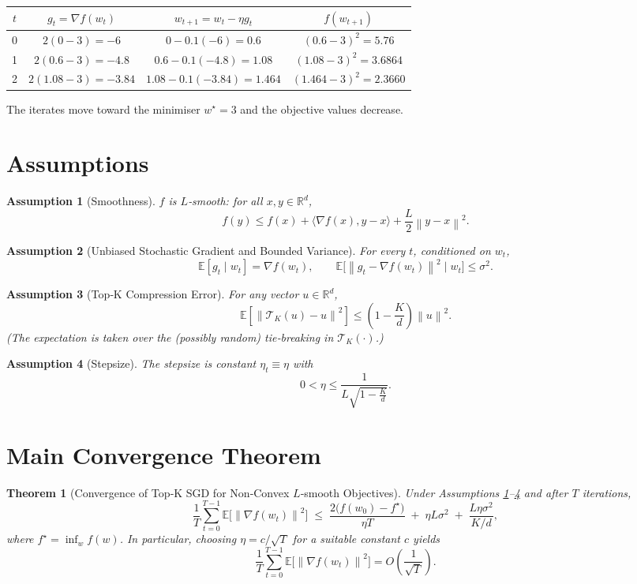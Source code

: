 \documentclass{article}
\newtheorem{theorem}{Theorem}
\newtheorem{assumption}{Assumption}
\newcommand{\E}{\mathbb{E}}
\newcommand{\R}{\mathbb{R}}
\newcommand{\norm}[1]{\left\|#1\right\|}
\newcommand{\topk}[1]{\mathcal{T}_K\!\left(#1\right)}
\begin{document}
\begin{center}
\begin{tabular}{c|c|c|c}
$t$ & $g_t=\nabla f(w_t)$ & $w_{t+1}=w_t-\eta g_t$ & $f(w_{t+1})$\\\hline
0 & $2(0-3)=-6$ & $0-0.1(-6)=0.6$ & $(0.6-3)^2=5.76$\\
1 & $2(0.6-3)=-4.8$ & $0.6-0.1(-4.8)=1.08$ & $(1.08-3)^2=3.6864$\\
2 & $2(1.08-3)=-3.84$ & $1.08-0.1(-3.84)=1.464$ & $(1.464-3)^2=2.3660$
\end{tabular}
\end{center}
The iterates move toward the minimiser $w^\star=3$ and the objective values decrease.

\newpage
\section*{Assumptions}
\begin{assumption}[Smoothness]
\label{as:smooth}
$f$ is $L$‑smooth: for all $x,y\in\R^{d}$,
\[
f(y)\le f(x)+\langle \nabla f(x),y-x\rangle+\frac{L}{2}\norm{y-x}^{2}.
\]
\end{assumption}
\begin{assumption}[Unbiased Stochastic Gradient and Bounded Variance]
\label{as:unbiased}
For every $t$, conditioned on $w_t$,
\[
\E[g_t\mid w_t]=\nabla f(w_t),\qquad 
\E\bigl[\norm{g_t-\nabla f(w_t)}^{2}\mid w_t\bigr]\le\sigma^{2}.
\]
\end{assumption}
\begin{assumption}[Top‑K Compression Error]
\label{as:topk}
For any vector $u\in\R^{d}$,
\[
\E\!\left[\norm{\topk{u}-u}^{2}\right]\le\left(1-\frac{K}{d}\right)\norm{u}^{2}.
\]
(The expectation is taken over the (possibly random) tie‑breaking in $\topk{\cdot}$.)
\end{assumption}
\begin{assumption}[Stepsize]
\label{as:stepsize}
The stepsize is constant $\eta_t\equiv\eta$ with
\[
0<\eta\le \frac{1}{L\sqrt{1-\frac{K}{d}}}.
\]
\end{assumption}

\section*{Main Convergence Theorem}
\begin{theorem}[Convergence of Top‑K SGD for Non‑Convex $L$‑smooth Objectives]
\label{thm:main}
Under Assumptions \ref{as:smooth}–\ref{as:stepsize} and after $T$ iterations,
\[
\frac{1}{T}\sum_{t=0}^{T-1}\E\!\bigl[\norm{\nabla f(w_t)}^{2}\bigr]
\;\le\;
\frac{2\bigl(f(w_0)-f^\star\bigr)}{\eta T}
\;+\;
\eta L\sigma^{2}
\;+\;
\frac{L\eta\sigma^{2}}{K/d},
\]
where $f^\star=\inf_{w}f(w)$.  In particular, choosing $\eta=c/\sqrt{T}$ for a suitable constant $c$ yields
\[
\frac{1}{T}\sum_{t=0}^{T-1}\E\!\bigl[\norm{\nabla f(w_t)}^{2}\bigr]
= O\!\left(\frac{1}{\sqrt{T}}\right).
\]
\end{theorem}
\end{document}
